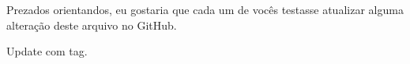 \documentclass{article}
\begin{document}
Prezados orientandos,
eu gostaria que cada um de vocês testasse atualizar alguma alteração deste arquivo no GitHub.

Update com tag.
\end{document}
